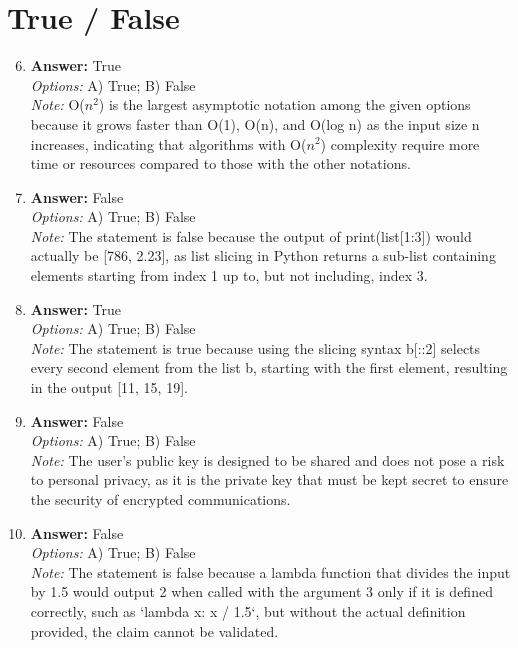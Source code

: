 \documentclass[12pt]{article}
\begin{document}
\section*{True / False}
\begin{enumerate}[label=\arabic*.]
\setcounter{enumi}{5}
\item \textbf{Answer:} True
\\ \textit{Options:} A) True; B) False
\\ \textit{Note:} O($n^2$) is the largest asymptotic notation among the given options because it grows faster than O(1), O(n), and O(log n) as the input size n increases, indicating that algorithms with O($n^2$) complexity require more time or resources compared to those with the other notations.
\item \textbf{Answer:} False
\\ \textit{Options:} A) True; B) False
\\ \textit{Note:} The statement is false because the output of print(list[1:3]) would actually be [786, 2.23], as list slicing in Python returns a sub-list containing elements starting from index 1 up to, but not including, index 3.
\item \textbf{Answer:} True
\\ \textit{Options:} A) True; B) False
\\ \textit{Note:} The statement is true because using the slicing syntax b[::2] selects every second element from the list b, starting with the first element, resulting in the output [11, 15, 19].
\item \textbf{Answer:} False
\\ \textit{Options:} A) True; B) False
\\ \textit{Note:} The user's public key is designed to be shared and does not pose a risk to personal privacy, as it is the private key that must be kept secret to ensure the security of encrypted communications.
\item \textbf{Answer:} False
\\ \textit{Options:} A) True; B) False
\\ \textit{Note:} The statement is false because a lambda function that divides the input by 1.5 would output 2 when called with the argument 3 only if it is defined correctly, such as `lambda x: x / 1.5`, but without the actual definition provided, the claim cannot be validated.
\end{enumerate}
\end{document}
